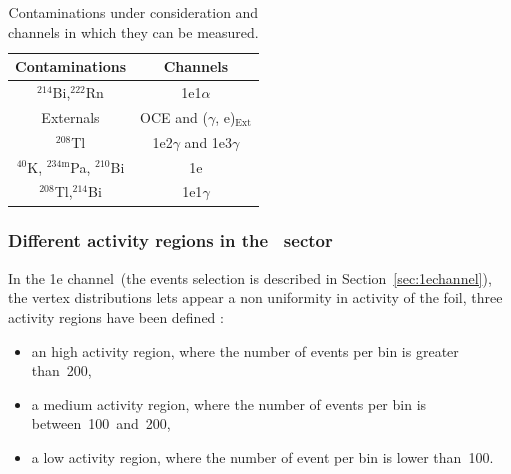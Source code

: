 \documentclass[main.tex]{subfiles}
\begin{document}
\begin{table}[h!]
\centering
\begin{tabular}{c|c}
\toprule
Contaminations & Channels \\[0.1cm]
\hline
$^{\text{214}}$Bi,$^{\text{222}}$Rn                    & 1e1$\alpha$                           \\[0.1cm]  
Externals                                              & OCE and ($\gamma$, e)$_{\text{Ext}}$  \\[0.1cm]
$^{\text{208}}$Tl                                      & 1e2$\gamma$  and 1e3$\gamma$          \\[0.1cm]
$^{\text{40}}$K, $^{\text{234m}}$Pa, $^{\text{210}}$Bi & 1e                                    \\[0.1cm]
$^{\text{208}}$Tl,$^{\text{214}}$Bi                    & 1e1$\gamma$                           \\[0.1cm] 
\bottomrule
\end{tabular}
\caption{Contaminations under consideration and channels in which they can be measured.}
\label{TableChannelBKG}
\end{table}


\bigskip


\subsubsection{Different activity regions in the \Cd~sector}

\NI In the 1e channel~(the events
 selection is described in Section~\ref{sec:1echannel}), the vertex distributions lets appear a non uniformity in activity of the foil, three activity regions have been defined : 


\begin{itemize}
\item an high activity region, where the number of events per bin is greater than~200,
\item a medium activity region, where the number of events per bin is between~100~and~200,
\item a low activity region, where the number of event per bin is lower than~100.

\end{itemize}
\end{document}
